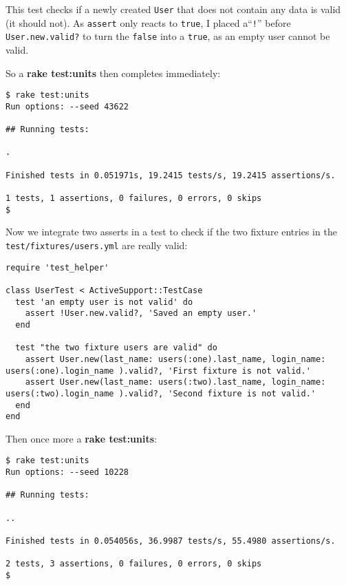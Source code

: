 \documentclass[a4paper]{book}
\begin{document}
This test checks if a newly created \texttt{User} that does not contain any data is valid (it should not). As \texttt{assert} only reacts to \texttt{true}, I placed a“\texttt{!}” before \texttt{User.new.valid?} to turn the \texttt{false} into a \texttt{true}, as an empty user cannot be valid.

So a \textbf{rake test:units} then completes immediately:

\begin{shaded}\begin{verbatim}
$ rake test:units
Run options: --seed 43622

## Running tests:

.

Finished tests in 0.051971s, 19.2415 tests/s, 19.2415 assertions/s.

1 tests, 1 assertions, 0 failures, 0 errors, 0 skips
$
\end{verbatim}\end{shaded}

Now we integrate two asserts in a test to check if the two fixture entries in the \texttt{test/fixtures/users.yml} are really valid:

\begin{shaded}\begin{verbatim}
require 'test_helper'

class UserTest < ActiveSupport::TestCase
  test 'an empty user is not valid' do
    assert !User.new.valid?, 'Saved an empty user.'
  end

  test "the two fixture users are valid" do
    assert User.new(last_name: users(:one).last_name, login_name: users(:one).login_name ).valid?, 'First fixture is not valid.'
    assert User.new(last_name: users(:two).last_name, login_name: users(:two).login_name ).valid?, 'Second fixture is not valid.'
  end
end
\end{verbatim}\end{shaded}

Then once more a \textbf{rake test:units}:

\begin{shaded}\begin{verbatim}
$ rake test:units
Run options: --seed 10228

## Running tests:

..

Finished tests in 0.054056s, 36.9987 tests/s, 55.4980 assertions/s.

2 tests, 3 assertions, 0 failures, 0 errors, 0 skips
$
\end{verbatim}\end{shaded}
\end{document}
